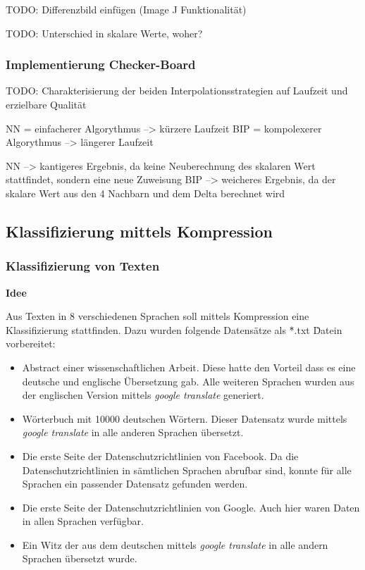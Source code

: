 \documentclass[12pt,german]{article}
\begin{document}
TODO: Differenzbild einfügen (Image J Funktionalität)

TODO: Unterschied in skalare Werte, woher? \\




\subsubsection{Implementierung Checker-Board}
TODO: Charakterisierung der beiden Interpolationsstrategien auf Laufzeit und erzielbare Qualität

 NN = einfacherer Algorythmus --> kürzere Laufzeit
BIP = kompolexerer Algorythmus --> längerer Laufzeit

NN --> kantigeres Ergebnis, da keine Neuberechnung des skalaren Wert stattfindet, sondern eine neue Zuweisung
BIP --> weicheres Ergebnis, da der skalare Wert aus den 4 Nachbarn und dem Delta berechnet wird


\subsection{Klassifizierung mittels Kompression}
\subsubsection{Klassifizierung von Texten}

\textbf{Idee}

Aus Texten in 8 verschiedenen Sprachen soll mittels Kompression eine Klassifizierung stattfinden. Dazu wurden folgende Datensätze als \" *.txt \" Datein vorbereitet:

\begin{itemize}
	\item Abstract einer wissenschaftlichen Arbeit. Diese hatte den Vorteil dass es eine deutsche und englische Übersetzung gab. Alle weiteren Sprachen wurden aus der englischen Version mittels \textit{google translate} generiert.
	\item Wörterbuch mit 10000 deutschen Wörtern. Dieser Datensatz wurde mittels \textit{google translate} in alle anderen Sprachen übersetzt.
	\item Die erste Seite der Datenschutzrichtlinien von Facebook. Da die Datenschutzrichtlinien in sämtlichen Sprachen abrufbar sind, konnte für alle Sprachen ein passender Datensatz gefunden werden.
	\item Die erste Seite der Datenschutzrichtlinien von Google. Auch hier waren Daten in allen Sprachen verfügbar.
	\item Ein Witz der aus dem deutschen mittels \textit{google translate} in alle andern Sprachen übersetzt wurde.
\end{itemize}
\end{document}
